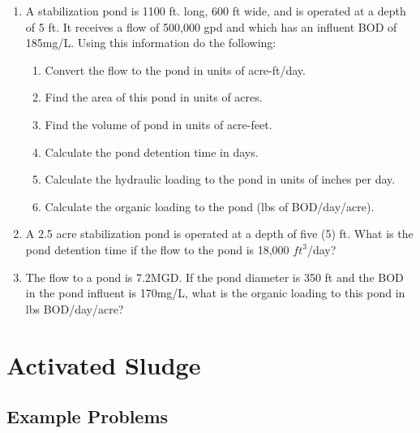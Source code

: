 \begin{enumerate}

\item A stabilization pond is 1100 ft. long, 600 ft wide, and is operated at a depth of 5 ft. It receives a flow of 500,000 gpd and which has an influent BOD of 185mg/L.  Using this information do the following:
\begin{enumerate}
\item Convert the flow to the pond in units of acre-ft/day.
\item Find the area of this pond in units of acres.
\item Find the volume of pond in units of acre-feet.
\item Calculate the pond detention time in days.
\item Calculate the hydraulic loading to the pond in units of inches per day.
\item Calculate the organic loading to the pond (lbs of BOD/day/acre).
\end{enumerate}

\item  A 2.5 acre stabilization pond is operated at a depth of five (5) ft. What is the pond detention time if the flow to the pond is 18,000 $ft^3$/day? 

\item The flow to a pond is 7.2MGD. If the pond diameter is 350 ft and the BOD in the pond influent is 170mg/L, what is the organic loading to this pond in lbs BOD/day/acre?
\\
\end{enumerate}


\newpage

\section{Activated Sludge}

\subsection{Example Problems} 

